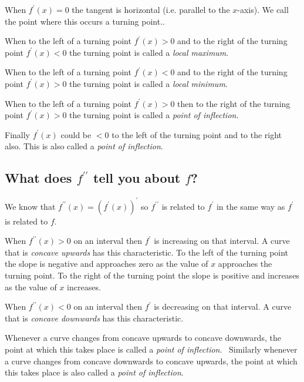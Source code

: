 When $f^{ \prime } (x) =0$ the tangent is horizontal (i.e. parallel to the $x$-axis). We call the point where this occurs a turning point.. 

When
to the left of a turning point $f^{ \prime } (x) >0$ and to the right of the turning point $f^{ \prime } (x) <0$ the turning point is called a \emph{local maximum}. 

When to the left of a turning point
$f^{ \prime } (x) <0$ and to the right of the turning point $f^{ \prime } (x) >0$ the turning point is called a \emph{local minimum}. 

When to the left of a turning point
$f^{ \prime } (x) >0$ then to the right of the turning point $f^{ \prime } (x) >0$ the turning point is called a \emph{point of inflection}. 

Finally $f^{ \prime } (x)$ could be $ <0$ to the left of the turning point and to the right also. This is also called a \emph{point
	of inflection}. 

\subsection*{What does $f^{ \prime  \prime }$ tell you about $f$?}
We know that $f^{ \prime  \prime } (x) =\left (f^{ \prime } (x)\right )^{ \prime }$ so $f^{ \prime  \prime }$ is related to $f^{ \prime }$ in the same way as $f^{ \prime }$ is related to $f$. 

When $f^{ \prime  \prime } (x) >0$ on an interval then $f^{ \prime }$ is increasing on that interval. A curve that is \emph{concave upwards}
has this characteristic. To the left of the turning point the slope is negative and approaches zero as the value
of $x$ approaches the turning point. To the right of the turning point the slope is positive
and increases as the value of $x$ increases. 

When $f^{ \prime  \prime } (x) <0$ on an interval then $f^{ \prime }$ is decreasing on that interval. A curve that is \emph{concave downwards} has this characteristic. 

Whenever
a curve changes from concave upwards to concave downwards, the point at which this takes place is called a \emph{point of inflection}.
\ Similarly whenever a curve changes from concave downwards to concave upwards, the point at which this takes
place is also called a \emph{point of inflection}. 



